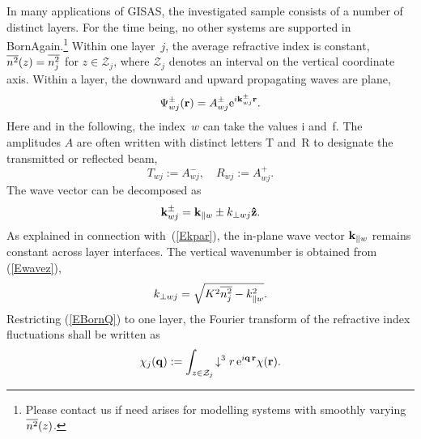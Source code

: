 In many applications of GISAS,
the investigated sample consists of a number of distinct layers.
For the time being,
no other systems are supported in BornAgain.\footnote
{Please contact us if need arises for modelling systems with
smoothly varying~$\overline{n^2}(z)$.
%
}
Within one layer~$j$, the average refractive index is constant,
$\overline{n^2}(z)=\overline{n_j^2}$ for $z\in\mathcal{Z}_j$, where
$\mathcal{Z}_j$ denotes an interval on the vertical coordinate axis.
Within a layer,
the downward and upward propagating waves are plane,
\begin{equation}
  \Psi^\pm_{wj}(\mathbf{r})=A^\pm_{wj}\text{e}^{i\mathbf{k}^\pm_{wj}\mathbf{r}}.
\end{equation}
%
%
%
%
%
Here and in the following,
the index~$w$ can take the values i and~f.
The amplitudes $A$ are often written with distinct letters
T and~R to designate the transmitted or reflected beam,
\begin{equation}
  T_{wj} := A^-_{wj},\quad
  R_{wj} := A^+_{wj}.
\end{equation}
%
%
The wave vector can be decomposed as
\begin{equation}
  \mathbf{k}^\pm_{wj}= \mathbf{k}_{\parallel w} \pm k_{\perp wj}\mathbf{\hat z}.
\end{equation}
%
%
As explained in connection with~(\ref{Ekpar}),
the in-plane wave vector $\mathbf{k}_{\parallel w}$ remains constant
across layer interfaces.
The vertical wavenumber is obtained from (\ref{Ewavez}),
\begin{equation}
  k_{\perp wj} = \sqrt{K^2 \overline{n_j^2} - k_{\parallel w}^2}.
\end{equation}
Restricting (\ref{EBornQ}) to one layer,
the Fourier transform of the refractive index fluctuations
shall be written as
\begin{equation}\label{Echij}
  \chi_j(\mathbf{q})
  := \int_{z\in\mathcal{Z}_j}\!\downarrow^3r\, \text{e}^{i\mathbf{q}\,\mathbf{r}}\chi(\mathbf{r}).
\end{equation}
